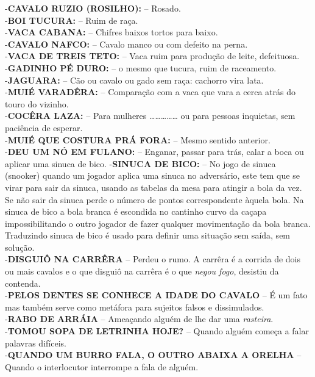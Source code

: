 \documentclass[12pt,brazil,]{book}
\begin{document}
\begin{itemize}
  -\textbf{CAVALO RUZIO (ROSILHO):} -- Rosado.\\
  -\textbf{BOI TUCURA:} -- Ruim de raça.\\
  -\textbf{VACA CABANA:} -- Chifres baixos tortos para baixo.\\
  -\textbf{CAVALO NAFCO:} -- Cavalo manco ou com defeito na perna.\\
  -\textbf{VACA DE TREIS TETO:} -- Vaca ruim para produção de leite,
  defeituosa.\\
  -\textbf{GADINHO PÉ DURO:} -- o mesmo que tucura, ruim de
  raceamento.\\
  -\textbf{JAGUARA:} -- Cão ou cavalo ou gado sem raça: cachorro vira
  lata.\\
  -\textbf{MUIÉ VARADÊRA:} -- Comparação com a vaca que vara a cerca
  atrás do touro do vizinho.\\
  -\textbf{COCÊRA LAZA:} -- Para mulheres
  \ldots{}\ldots{}\ldots{}\ldots{}\ldots{} ou para pessoas inquietas,
  sem paciência de esperar.\\
  -\textbf{MUIÉ QUE COSTURA PRÁ FORA:} -- Mesmo sentido anterior.\\
  -\textbf{DEU UM NÓ EM FULANO:} -- Enganar, passar para trás, calar a
  boca ou aplicar uma sinuca de bico. -\textbf{SINUCA DE BICO:} -- No
  jogo de sinuca (snooker) quando um jogador aplica uma sinuca no
  adversário, este tem que se virar para sair da sinuca, usando as
  tabelas da mesa para atingir a bola da vez. Se não sair da sinuca
  perde o número de pontos correspondente àquela bola. Na sinuca de bico
  a bola branca é escondida no cantinho curvo da caçapa impossibilitando
  o outro jogador de fazer qualquer movimentação da bola branca.
  Traduzindo sinuca de bico é usado para definir uma situação sem saída,
  sem solução.\\
  -\textbf{DISGUIÔ NA CARRÊRA} -- Perdeu o rumo. A carrêra é a corrida
  de dois ou mais cavalos e o que disguiô na carrêra é o que \emph{negou
  fogo}, desistiu da contenda.\\
  -\textbf{PELOS DENTES SE CONHECE A IDADE DO CAVALO} -- É um fato mas
  também serve como metáfora para sujeitos falsos e dissimulados.\\
  -\textbf{RABO DE ARRÁIA} -- Ameaçando alguém de lhe dar uma
  \emph{rasteira}.\\
  -\textbf{TOMOU SOPA DE LETRINHA HOJE?} -- Quando alguém começa a falar
  palavras difíceis.\\
  -\textbf{QUANDO UM BURRO FALA, O OUTRO ABAIXA A ORELHA} -- Quando o
  interlocutor interrompe a fala de alguém.\\

\end{itemize}
\end{document}
